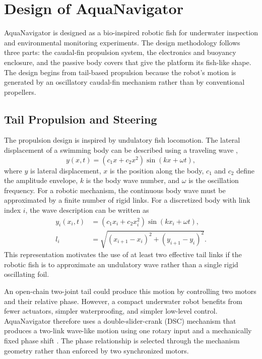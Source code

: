 \documentclass{uhcoethesis}
\begin{document}
\section{Design of AquaNavigator}

AquaNavigator is designed as a bio-inspired robotic fish for underwater inspection and environmental monitoring experiments. The design methodology follows three parts: the caudal-fin propulsion system, the electronics and buoyancy enclosure, and the passive body covers that give the platform its fish-like shape. The design begins from tail-based propulsion because the robot's motion is generated by an oscillatory caudal-fin mechanism rather than by conventional propellers.

\subsection{Tail Propulsion and Steering}

The propulsion design is inspired by undulatory fish locomotion. The lateral displacement of a swimming body can be described using a traveling wave \cite{Lighthill1969,Lighthill1971},
\begin{equation}
    y(x,t) = (c_1x+c_2x^2)\sin(kx+\omega t),
    \label{eq:ch2_design_wave}
\end{equation}
where $y$ is lateral displacement, $x$ is the position along the body, $c_1$ and $c_2$ define the amplitude envelope, $k$ is the body wave number, and $\omega$ is the oscillation frequency. For a robotic mechanism, the continuous body wave must be approximated by a finite number of rigid links. For a discretized body with link index $i$, the wave description can be written as
\begin{equation}
    \begin{aligned}
        y_i(x_i,t) &= (c_1x_i+c_2x_i^2)\sin(kx_i+\omega t), \\
        l_i &= \sqrt{(x_{i+1}-x_i)^2+(y_{i+1}-y_i)^2}.
    \end{aligned}
    \label{eq:ch2_discrete_wave}
\end{equation}
This representation motivates the use of at least two effective tail links if the robotic fish is to approximate an undulatory wave rather than a single rigid oscillating foil.

An open-chain two-joint tail could produce this motion by controlling two motors and their relative phase. However, a compact underwater robot benefits from fewer actuators, simpler waterproofing, and simpler low-level control. AquaNavigator therefore uses a double-slider-crank (DSC) mechanism that produces a two-link wave-like motion using one rotary input and a mechanically fixed phase shift \cite{Zuo2021}. The phase relationship is selected through the mechanism geometry rather than enforced by two synchronized motors.
\end{document}
